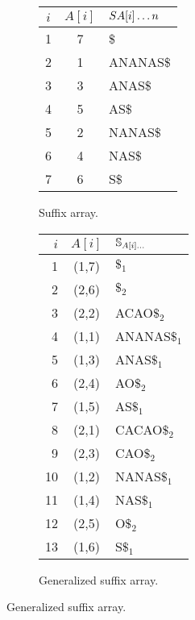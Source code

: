 \begin{figure}[b]
\begin{center}
\caption[Example of (generalized) suffix array]{(Generalized) suffix array. () Suffix array of the string {\ttfamily ANANAS\$}. () Generalized suffix array of the string collection $\Strings = \{$ {\ttfamily ANANAS$\$_1$}, {\ttfamily CACAO$\$_2$} $\}$.}

\begin{subfigure}[t]{0.45\textwidth}
\begin{center}
\caption[Example of suffix array]{Suffix array.}
\label{fig:sa}
\ttfamily
\begin{tabular}{ccl}
$i$ & $A[i]$ & $S{A[i]\dots n}$\\
\midrule
1 & 7 & \$\\
2 & 1 & ANANAS\$\\
3 & 3 & ANAS\$\\
4 & 5 & AS\$\\
5 & 2 & NANAS\$\\
6 & 4 & NAS\$\\
7 & 6 & S\$\\
\end{tabular}
\end{center}
\end{subfigure}%
\begin{subfigure}[t]{0.45\textwidth}
\begin{center}
\caption[Example of generalized suffix array]{Generalized suffix array.}
\label{fig:gsa}
\ttfamily
\begin{tabular}{rcl}
$i$ & $A[i]$ & $\mathbb{S}_{A[i]\dots}$\\
\midrule
1 & (1,7) & $\$_1$\\
2 & (2,6) & $\$_2$\\
3 & (2,2) & ACAO$\$_2$\\
4 & (1,1) & ANANAS$\$_1$\\
5 & (1,3) & ANAS$\$_1$\\
6 & (2,4) & AO$\$_2$\\
7 & (1,5) & AS$\$_1$\\
8 & (2,1) & CACAO$\$_2$\\
9 & (2,3) & CAO$\$_2$\\
10 & (1,2) & NANAS$\$_1$\\
11 & (1,4) & NAS$\$_1$\\
12 & (2,5) & O$\$_2$\\
13 & (1,6) & S$\$_1$\\
\end{tabular}
\end{center}
\end{subfigure}

\end{center}
\end{figure}

